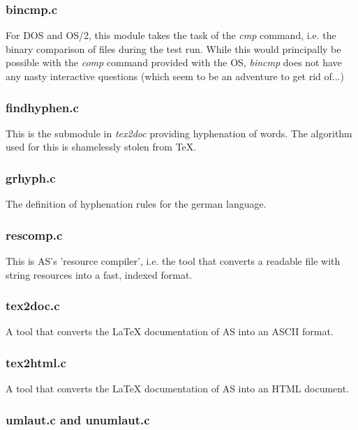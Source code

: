 \documentclass[12pt,twoside]{report}
\begin{document}
\subsubsection{bincmp.c}

For DOS and OS/2, this module takes the task of the {\em cmp} command,
i.e. the binary comparison of files during the test run.  While this would
principally be possible with the {\em comp} command provided with the OS,
{\em bincmp} does not have any nasty interactive questions (which seem to
be an adventure to get rid of...)

\subsubsection{findhyphen.c}

This is the submodule in {\em tex2doc} providing hyphenation of words. 
The algorithm used for this is shamelessly stolen from TeX.

\subsubsection{grhyph.c}

The definition of hyphenation rules for the german language.

\subsubsection{rescomp.c}

This is AS's 'resource compiler', i.e. the tool that converts a readable
file with string resources into a fast, indexed format.

\subsubsection{tex2doc.c}

A tool that converts the LaTeX documentation of AS into an ASCII format.

\subsubsection{tex2html.c}

A tool that converts the LaTeX documentation of AS into an HTML document.

\subsubsection{umlaut.c and unumlaut.c}
\end{document}
